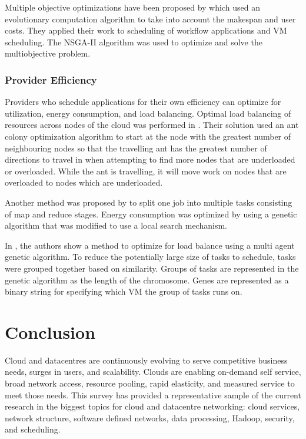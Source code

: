 \documentclass[12pt]{article}
\begin{document}
Multiple objective optimizations have been proposed by \cite{szabo2012evolving} which used an evolutionary computation algorithm to take into account the makespan and user costs. They applied their work to scheduling of workflow applications and VM scheduling. The NSGA-II algorithm was used to optimize and solve the multiobjective problem.




\subsubsection{Provider Efficiency}


Providers who schedule applications for their own efficiency can optimize for utilization, energy consumption, and load balancing. Optimal load balancing of resources across nodes of the cloud was performed in \cite{nishant2012load}. Their solution used an ant colony optimization algorithm to start at the node with the greatest number of neighbouring nodes so that the travelling ant has the greatest number of directions to travel in when attempting to find more nodes that are underloaded or overloaded. While the ant is travelling, it will move work on nodes that are overloaded to nodes which are underloaded.

Another method was proposed by \cite{wang2012energy} to split one job into multiple tasks consisting of map and reduce stages. Energy consumption was optimized by using a genetic algorithm that was modified to use a local search mechanism.

In \cite{zhu2011hybrid}, the authors show a method to optimize for load balance using a multi agent genetic algorithm. To reduce the potentially large size of tasks to schedule, tasks were grouped together based on similarity. Groups of tasks are represented in the genetic algorithm as the length of the chromosome. Genes are represented as a binary string for specifying which VM the group of tasks runs on.





\section{Conclusion} \label{sec:conclusion}


Cloud and datacentres are continuously evolving to serve competitive business needs, surges in users, and scalability. Clouds are enabling on-demand self service, broad network access, resource pooling, rapid elasticity, and measured service \cite{mell2011nist} to meet those needs. This survey has provided a representative sample of the current research in the biggest topics for cloud and datacentre networking: cloud services, network structure, software defined networks, data processing, Hadoop, security, and scheduling.

\newpage

\printbibliography
\end{document}
